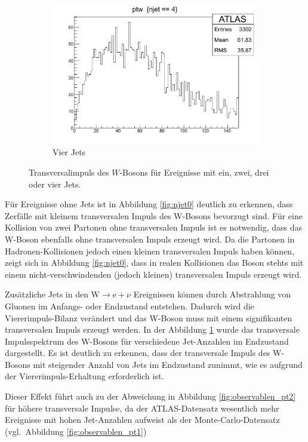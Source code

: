 \documentclass[11pt, a4paper]{article}
\numberwithin{equation}{section}
\begin{document}
\begin{figure}
\begin{subfigure}{.49\textwidth}
	\end{subfigure}
	\begin{subfigure}{.49\textwidth}
		\centering
		\includegraphics[width=.7\textwidth]{./data/root/wmass/exercise2/njet4.pdf}
		\caption{Vier Jets}
	\end{subfigure}
	\caption{Transversalimpuls des $W$-Bosons für Ereignisse mit ein, zwei, drei oder vier Jets.}
	\label{fig:njet1-4}
\end{figure}

Für Ereignisse ohne Jets ist in Abbildung \ref{fig:njet0} deutlich zu erkennen, dass Zerfälle mit kleinem transversalen Impuls des W-Bosons bevorzugt sind.
Für eine Kollision von zwei Partonen ohne transversalen Impuls ist es notwendig, dass das W-Boson ebenfalls ohne transversalen Impuls erzeugt wird.
Da die Partonen in Hadronen-Kollisionen jedoch einen kleinen transversalen Impuls haben können, zeigt sich in Abbildung \ref{fig:njet0}, dass in realen Kollisionen das Boson stehts mit einem nicht-verschwindenden (jedoch kleinen) transversalen Impuls erzeugt wird.

Zusätzliche Jets in den $\mathrm{W} \rightarrow \mathrm{e} + \nu$ Ereignissen können durch Abstrahlung von Gluonen im Anfangs- oder Endzustand entstehen.
Dadurch wird die Viererimpuls-Bilanz verändert und das W-Boson muss mit einem signifikanten transversalen Impuls erzeugt werden.
In der Abbildung \ref{fig:njet1-4} wurde das transversale Impulsspektrum des W-Bosons für verschiedene Jet-Anzahlen im Endzustand dargestellt.
Es ist deutlich zu erkennen, dass der transversale Impuls des W-Bosons mit steigender Anzahl von Jets im Endzustand zunimmt, wie es aufgrund der Viererimpuls-Erhaltung erforderlich ist.

Dieser Effekt führt auch zu der Abweichung in Abbildung \ref{fig:observablen_pt2} für höhere transversale Impulse, da der ATLAS-Datensatz wesentlich mehr Ereignisse mit hohen Jet-Anzahlen aufweist als der Monte-Carlo-Datensatz (vgl.\ Abbildung \ref{fig:observablen_pt1})
\end{document}
